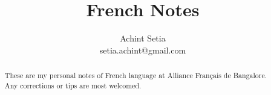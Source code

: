\documentclass[12pt]{article}
\title{French Notes}
\author{Achint Setia\\
		setia.achint@gmail.com}
\begin{document}
\maketitle

\tableofcontents

\newpage

\begin{abstract}
	These are my personal notes of French language at Alliance Fran\c{c}ais de Bangalore. Any corrections or tips are most welcomed.
\end{abstract}













\end{document}

